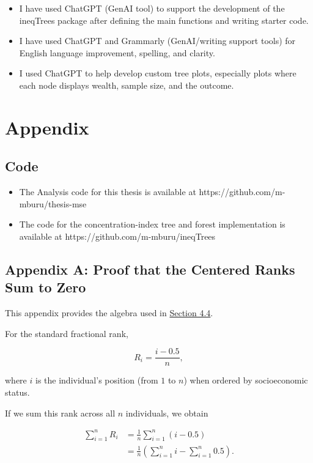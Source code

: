 \documentclass[
  11pt,
  a4paper,
]{article}
\providecommand{\tightlist}{%
  \setlength{\itemsep}{0pt}\setlength{\parskip}{0pt}}
\begin{document}
\begin{itemize}
\tightlist
\item
  I have used ChatGPT (GenAI tool) to support the development of the
  ineqTrees package after defining the main functions and writing
  starter code.
\item
  I have used ChatGPT and Grammarly (GenAI/writing support tools) for
  English language improvement, spelling, and clarity.
\item
  I used ChatGPT to help develop custom tree plots, especially plots
  where each node displays wealth, sample size, and the outcome.
\end{itemize}

\section{Appendix}\label{sec-appendix}

\subsection{Code}\label{code}

\begin{itemize}
\tightlist
\item
  The Analysis code for this thesis is available at
  https://github.com/m-mburu/thesis-mse
\item
  The code for the concentration-index tree and forest implementation is
  available at https://github.com/m-mburu/ineqTrees
\end{itemize}

\subsection{Appendix A: Proof that the Centered Ranks Sum to
Zero}\label{app-centered-rank-proof}

This appendix provides the algebra used in
\hyperref[sec-shap-decomposition-definition]{Section 4.4}.

For the standard fractional rank,

\[
R_i = \frac{i - 0.5}{n},
\]

where \(i\) is the individual's position (from \(1\) to \(n\)) when
ordered by socioeconomic status.

If we sum this rank across all \(n\) individuals, we obtain

\[
\begin{aligned}
\sum_{i=1}^n R_i &= \frac{1}{n} \sum_{i=1}^n (i - 0.5) \\
&= \frac{1}{n} \left( \sum_{i=1}^n i - \sum_{i=1}^n 0.5 \right).
\end{aligned}
\]
\end{document}
